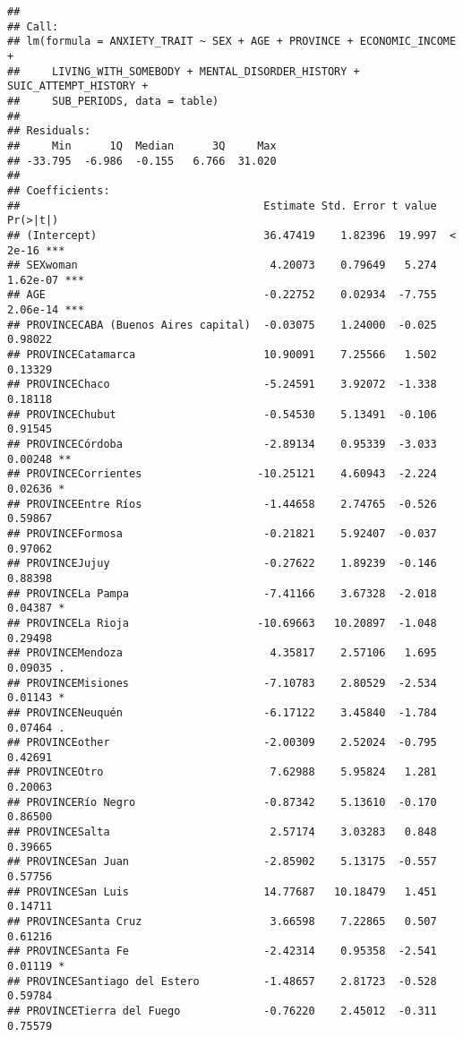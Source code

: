 \documentclass[
]{book}
\begin{document}
\begin{verbatim}
## 
## Call:
## lm(formula = ANXIETY_TRAIT ~ SEX + AGE + PROVINCE + ECONOMIC_INCOME + 
##     LIVING_WITH_SOMEBODY + MENTAL_DISORDER_HISTORY + SUIC_ATTEMPT_HISTORY + 
##     SUB_PERIODS, data = table)
## 
## Residuals:
##     Min      1Q  Median      3Q     Max 
## -33.795  -6.986  -0.155   6.766  31.020 
## 
## Coefficients:
##                                      Estimate Std. Error t value Pr(>|t|)    
## (Intercept)                          36.47419    1.82396  19.997  < 2e-16 ***
## SEXwoman                              4.20073    0.79649   5.274 1.62e-07 ***
## AGE                                  -0.22752    0.02934  -7.755 2.06e-14 ***
## PROVINCECABA (Buenos Aires capital)  -0.03075    1.24000  -0.025  0.98022    
## PROVINCECatamarca                    10.90091    7.25566   1.502  0.13329    
## PROVINCEChaco                        -5.24591    3.92072  -1.338  0.18118    
## PROVINCEChubut                       -0.54530    5.13491  -0.106  0.91545    
## PROVINCECórdoba                      -2.89134    0.95339  -3.033  0.00248 ** 
## PROVINCECorrientes                  -10.25121    4.60943  -2.224  0.02636 *  
## PROVINCEEntre Ríos                   -1.44658    2.74765  -0.526  0.59867    
## PROVINCEFormosa                      -0.21821    5.92407  -0.037  0.97062    
## PROVINCEJujuy                        -0.27622    1.89239  -0.146  0.88398    
## PROVINCELa Pampa                     -7.41166    3.67328  -2.018  0.04387 *  
## PROVINCELa Rioja                    -10.69663   10.20897  -1.048  0.29498    
## PROVINCEMendoza                       4.35817    2.57106   1.695  0.09035 .  
## PROVINCEMisiones                     -7.10783    2.80529  -2.534  0.01143 *  
## PROVINCENeuquén                      -6.17122    3.45840  -1.784  0.07464 .  
## PROVINCEother                        -2.00309    2.52024  -0.795  0.42691    
## PROVINCEOtro                          7.62988    5.95824   1.281  0.20063    
## PROVINCERío Negro                    -0.87342    5.13610  -0.170  0.86500    
## PROVINCESalta                         2.57174    3.03283   0.848  0.39665    
## PROVINCESan Juan                     -2.85902    5.13175  -0.557  0.57756    
## PROVINCESan Luis                     14.77687   10.18479   1.451  0.14711    
## PROVINCESanta Cruz                    3.66598    7.22865   0.507  0.61216    
## PROVINCESanta Fe                     -2.42314    0.95358  -2.541  0.01119 *  
## PROVINCESantiago del Estero          -1.48657    2.81723  -0.528  0.59784    
## PROVINCETierra del Fuego             -0.76220    2.45012  -0.311  0.75579    

\end{verbatim}
\end{document}
